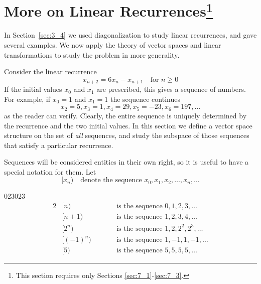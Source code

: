 \section[More on Linear Recurrences]{More on Linear Recurrences\footnote{This section requires only Sections \ref{sec:7_1}-\ref{sec:7_3}.}}
\label{sec:7_5}

In Section~\ref{sec:3_4} we used diagonalization to study linear recurrences, and gave several examples. We now apply the theory of vector spaces and linear transformations to study the problem in more generality.


Consider the linear recurrence
\begin{equation*}
x_{n+2} = 6x_n - x_{n+1} \quad \mbox{for } n \geq 0
\end{equation*}
If the initial values $x_{0}$ and $x_{1}$ are prescribed, this gives a sequence of numbers. For example, if $x_{0} = 1$ and $x_{1} = 1$ the sequence continues
\begin{equation*}
x_2 = 5, x_3 = 1, x_4 = 29, x_5 = -23, x_6 = 197, \dots
\end{equation*}
as the reader can verify. Clearly, the entire sequence is uniquely determined by the recurrence and the two initial values. In this section we define a vector space structure on the set of \textit{all} sequences, and study the subspace of those sequences that satisfy a particular recurrence.


Sequences will be considered entities in their own right, so it is useful to have a special notation for them. Let
\begin{equation*}
[x_n) \quad \mbox{denote the sequence } x_0, x_1, x_2, \dots, x_n, \dots
\end{equation*}
\begin{example}{}{023023}
\vspace*{-1em}
\begin{alignat*}{2}
&[n) & \quad\quad &\mbox{is the sequence } 0, 1, 2, 3, \dots \\
&[n + 1) & \quad\quad &\mbox{is the sequence } 1, 2, 3, 4, \dots \\
&[2^n) & \quad\quad &\mbox{is the sequence } 1, 2, 2^2, 2^3, \dots \\
&[(-1)^n) & \quad\quad &\mbox{is the sequence } 1, -1, 1, -1, \dots \\
&[5) & \quad\quad &\mbox{is the sequence } 5, 5, 5, 5, \dots
\end{alignat*}
\end{example}

